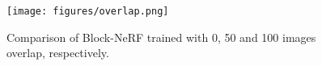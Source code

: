 \begin{figure}[ht]
    \centering
    \texttt{[image: figures/overlap.png]}
    \caption{Comparison of Block-NeRF trained with 0, 50 and 100 images overlap, respectively.}
    \label{fig:overlap}
\end{figure}